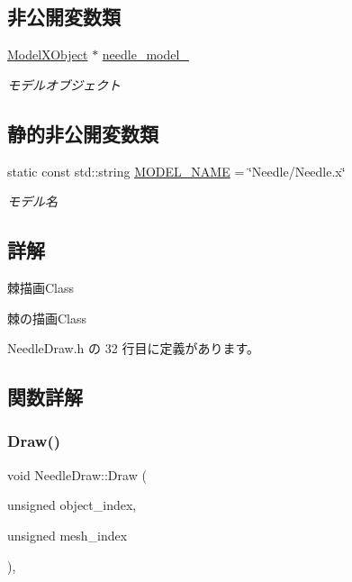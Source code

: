 \subsection*{非公開変数類}
\begin{DoxyCompactItemize}
\item 
\mbox{\hyperlink{class_model_x_object}{Model\+X\+Object}} $\ast$ \mbox{\hyperlink{class_needle_draw_ad6f458e91c2629526af29fa34a429f01}{needle\+\_\+model\+\_\+}}
\begin{DoxyCompactList}\small\item\em モデルオブジェクト \end{DoxyCompactList}\end{DoxyCompactItemize}
\subsection*{静的非公開変数類}
\begin{DoxyCompactItemize}
\item 
static const std\+::string \mbox{\hyperlink{class_needle_draw_a6b9fdc5c99ea8cb7e5d977b1e28d67a0}{M\+O\+D\+E\+L\+\_\+\+N\+A\+ME}} = \char`\"{}Needle/Needle.\+x\char`\"{}
\begin{DoxyCompactList}\small\item\em モデル名 \end{DoxyCompactList}\end{DoxyCompactItemize}


\subsection{詳解}
棘描画\+Class 

棘の描画\+Class 

 Needle\+Draw.\+h の 32 行目に定義があります。



\subsection{関数詳解}
\mbox{\label{class_needle_draw_a9fb9ee239ee432f2fc3235acbd24647c}} 
\subsubsection{\texorpdfstring{Draw()}{Draw()}}
{\footnotesize\ttfamily void Needle\+Draw\+::\+Draw (\begin{DoxyParamCaption}\item[{unsigned}]{object\+\_\+index,  }\item[{unsigned}]{mesh\+\_\+index }\end{DoxyParamCaption})\hspace{0.3cm}{\ttfamily [override]}, {\ttfamily [virtual]}}



